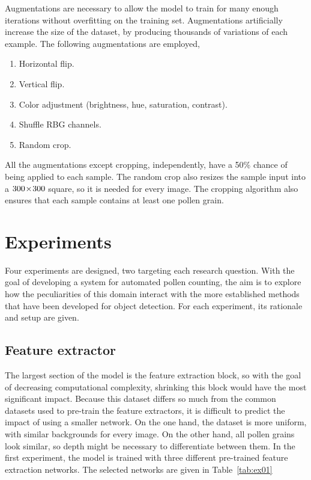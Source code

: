 Augmentations are necessary to allow the model to train for many enough iterations without overfitting on the training set.
Augmentations artificially increase the size of the dataset, by producing thousands of variations of each example.
The following augmentations are employed,
%
\begin{enumerate}
  \item Horizontal flip.
  \item Vertical flip.
  \item Color adjustment (brightness, hue, saturation, contrast).
  \item Shuffle RBG channels.
  \item Random crop.
\end{enumerate}
%
All the augmentations except cropping, independently, have a 50\% chance of being applied to each sample.
The random crop also resizes the sample input into a \(300\!\times \! 300\) square, so it is needed for every image.
The cropping algorithm also ensures that each sample contains at least one pollen grain.

\section{Experiments}\label{sec:method-experiments}
Four experiments are designed, two targeting each research question.
With the goal of developing a system for automated pollen counting, the aim is to explore how the peculiarities of this domain interact with the more established methods that have been developed for object detection.
For each experiment, its rationale and setup are given.

\subsection{Feature extractor}
The largest section of the model is the feature extraction block, so with the goal of decreasing computational complexity, shrinking this block would have the most significant impact.
Because this dataset differs so much from the common datasets used to pre-train the feature extractors, it is difficult to predict the impact of using a smaller network.
On the one hand, the dataset is more uniform, with similar backgrounds for every image. On the other hand, all pollen grains look similar, so depth might be necessary to differentiate between them.
In the first experiment, the model is trained with three different pre-trained feature extraction networks.
The selected networks are given in Table~\ref{tab:ex01}

